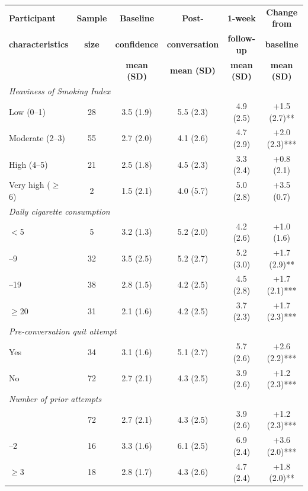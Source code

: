 \begin{table}[ht!]
  \centering
  \small
  \renewcommand{\arraystretch}{1.1}
  \begin{tabular*}{\linewidth}{@{\extracolsep{\fill}}lccccc@{}}
    \toprule
    \textbf{Participant} & \textbf{Sample} & \textbf{Baseline} & \textbf{Post-} & \textbf{1-week} & \textbf{Change from} \\
    \textbf{characteristics} & \textbf{size} & \textbf{confidence} & \textbf{conversation} & \textbf{follow-up} & \textbf{baseline} \\
    & & \textbf{mean (SD)} & \textbf{mean (SD)} & \textbf{mean (SD)} & \textbf{mean (SD)} \\
    \midrule
    \multicolumn{6}{l}{\textit{Heaviness of Smoking Index}} \\
    \quad Low (0--1) & 28 & 3.5 (1.9) & 5.5 (2.3) & 4.9 (2.5) & +1.5 (2.7)** \\
    \quad Moderate (2--3) & 55 & 2.7 (2.0) & 4.1 (2.6) & 4.7 (2.9) & +2.0 (2.3)*** \\
    \quad High (4--5) & 21 & 2.5 (1.8) & 4.5 (2.3) & 3.3 (2.4) & +0.8 (2.1) \\
    \quad Very high ($\geq$6) & 2 & 1.5 (2.1) & 4.0 (5.7) & 5.0 (2.8) & +3.5 (0.7) \\
    \midrule
    \multicolumn{6}{l}{\textit{Daily cigarette consumption}} \\
    \quad $<$5 & 5 & 3.2 (1.3) & 5.2 (2.0) & 4.2 (2.6) & +1.0 (1.6) \\
    \quad 5--9 & 32 & 3.5 (2.5) & 5.2 (2.7) & 5.2 (3.0) & +1.7 (2.9)** \\
    \quad 10--19 & 38 & 2.8 (1.5) & 4.2 (2.5) & 4.5 (2.8) & +1.7 (2.1)*** \\
    \quad $\geq$20 & 31 & 2.1 (1.6) & 4.2 (2.5) & 3.7 (2.3) & +1.7 (2.3)*** \\
    \midrule
    \multicolumn{6}{l}{\textit{Pre-conversation quit attempt}} \\
    \quad Yes & 34 & 3.1 (1.6) & 5.1 (2.7) & 5.7 (2.6) & +2.6 (2.2)*** \\
    \quad No & 72 & 2.7 (2.1) & 4.3 (2.5) & 3.9 (2.6) & +1.2 (2.3)*** \\
    \midrule
    \multicolumn{6}{l}{\textit{Number of prior attempts}} \\
    \quad 0 & 72 & 2.7 (2.1) & 4.3 (2.5) & 3.9 (2.6) & +1.2 (2.3)*** \\
    \quad 1--2 & 16 & 3.3 (1.6) & 6.1 (2.5) & 6.9 (2.4) & +3.6 (2.0)*** \\
    \quad $\geq$3 & 18 & 2.8 (1.7) & 4.3 (2.6) & 4.7 (2.4) & +1.8 (2.0)** \\

\end{tabular*}
\end{table}
